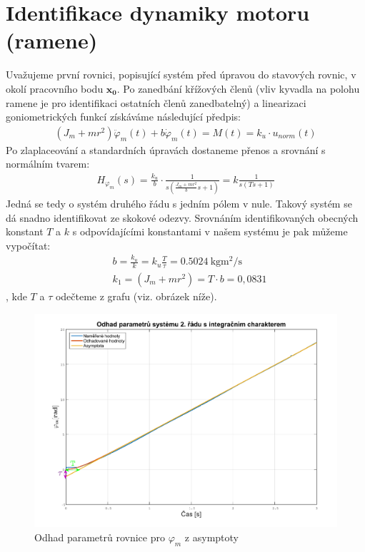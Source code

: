 \documentclass[a4paper,12pt]{article}
\begin{document}
\section{Identifikace dynamiky motoru (ramene)}
Uvažujeme první rovnici, popisující systém před úpravou do stavových rovnic, v okolí pracovního bodu $\mathbf{x_0}$. Po zanedbání křížových členů (vliv kyvadla na polohu ramene je pro identifikaci ostatních členů zanedbatelný) a linearizaci goniometrických funkcí získáváme následující předpis:
\begin{align*}
(J_m + mr^2)\ddot{\varphi}_m(t) + b\dot{\varphi}_m(t) = M(t) = k_u\cdot u_{norm}(t)
\end{align*}
Po zlaplaceování a standardních úpravách dostaneme přenos a srovnání s normálním tvarem:
\begin{align*}
H_{\varphi_m}(s) = \frac{k_u}{b}\cdot \frac{1}{s(\frac{J_m + mr^2}{b}s + 1)} = k\frac{1}{s(Ts + 1)}
\end{align*}
Jedná se tedy o systém druhého řádu s jedním pólem v nule. Takový systém se dá snadno identifikovat ze skokové odezvy. Srovnáním identifikovaných obecných konstant $T$ a $k$ s odpovídajícími konstantami v našem systému je pak můžeme vypočítat:
\begin{align*}
&b = \frac{k_u}{k} = k_u\frac{T}{\tau} = \SI{0,5024}{\kilo \gram \meter \squared \per \second}	\\
&k_1 = (J_m + mr^2) = T\cdot b = 0,0831
\end{align*}
, kde $T$ a $\tau$ odečteme z grafu (viz. obrázek níže).
\begin{figure}[H]
	\centering
    \includegraphics[scale=.4]{Odhad_phim}
    \caption{Odhad parametrů rovnice pro $\varphi_m$ z asymptoty}
\end{figure}
\end{document}
